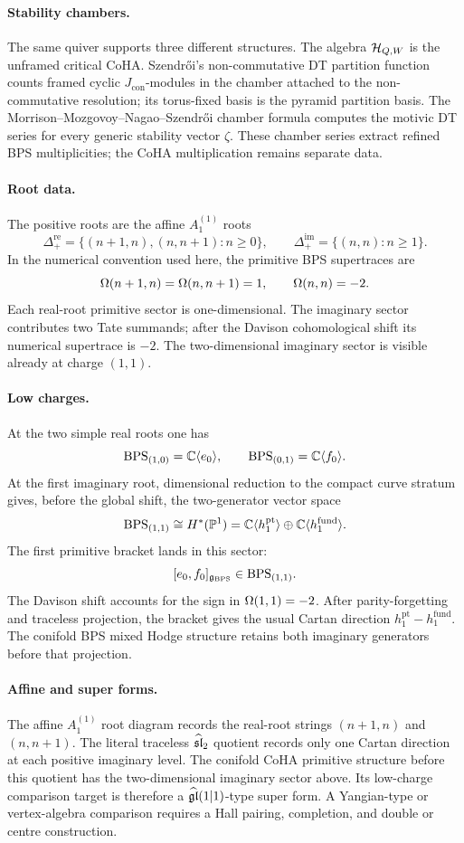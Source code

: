 \paragraph{Stability chambers.}
The same quiver supports three different structures. The algebra
\(\mathcal{H}_{Q,W}\) is the unframed critical CoHA. Szendr\H{o}i's
non-commutative DT partition function counts framed cyclic
\(J_{\mathrm{con}}\)-modules in the chamber attached to the
non-commutative resolution; its torus-fixed basis is the pyramid
partition basis. The Morrison--Mozgovoy--Nagao--Szendr\H{o}i chamber
formula computes the motivic DT series for every generic stability
vector \(\zeta\). These chamber series extract refined BPS
multiplicities; the CoHA multiplication remains separate data.

\paragraph{Root data.}
The positive roots are the affine \(A_1^{(1)}\) roots
\[
  \Delta_+^{\mathrm{re}}
  =\{(n+1,n),(n,n+1):n\geq 0\},\qquad
  \Delta_+^{\mathrm{im}}=\{(n,n):n\geq 1\}.
\]
In the numerical convention used here, the primitive BPS supertraces are
\[
  \Omega(n+1,n)=\Omega(n,n+1)=1,\qquad
  \Omega(n,n)=-2.
\]
Each real-root primitive sector is one-dimensional. The imaginary sector
contributes two Tate summands; after the Davison cohomological shift its
numerical supertrace is \(-2\). The two-dimensional imaginary sector is
visible already at charge \((1,1)\).

\paragraph{Low charges.}
At the two simple real roots one has
\[
  \mathrm{BPS}_{(1,0)}=\mathbb{C}\langle e_0\rangle,\qquad
  \mathrm{BPS}_{(0,1)}=\mathbb{C}\langle f_0\rangle .
\]
At the first imaginary root, dimensional reduction to the compact curve
stratum gives, before the global shift, the two-generator vector space
\[
  \mathrm{BPS}_{(1,1)}
  \cong H^*(\mathbb{P}^1)
  =\mathbb{C}\langle h_1^{\mathrm{pt}}\rangle
  \oplus \mathbb{C}\langle h_1^{\mathrm{fund}}\rangle .
\]
The first primitive bracket lands in this sector:
\[
  [e_0,f_0]_{\mathfrak{g}_{\mathrm{BPS}}}\in \mathrm{BPS}_{(1,1)}.
\]
The Davison shift accounts for the sign in \(\Omega(1,1)=-2\). After
parity-forgetting and traceless projection, the bracket gives the usual
Cartan direction \(h_1^{\mathrm{pt}}-h_1^{\mathrm{fund}}\). The conifold
BPS mixed Hodge structure retains both imaginary generators before that
projection.

\paragraph{Affine and super forms.}
The affine \(A_1^{(1)}\) root diagram records the real-root strings
\((n+1,n)\) and \((n,n+1)\). The literal traceless
\(\widehat{\mathfrak{sl}}_2\) quotient records only one Cartan direction at each
positive imaginary level. The conifold CoHA primitive structure before
this quotient has the two-dimensional imaginary sector above. Its
low-charge comparison target is therefore a
\(\widehat{\mathfrak{gl}}(1|1)\)-type super form. A Yangian-type or
vertex-algebra comparison requires a Hall pairing, completion, and
double or centre construction.

